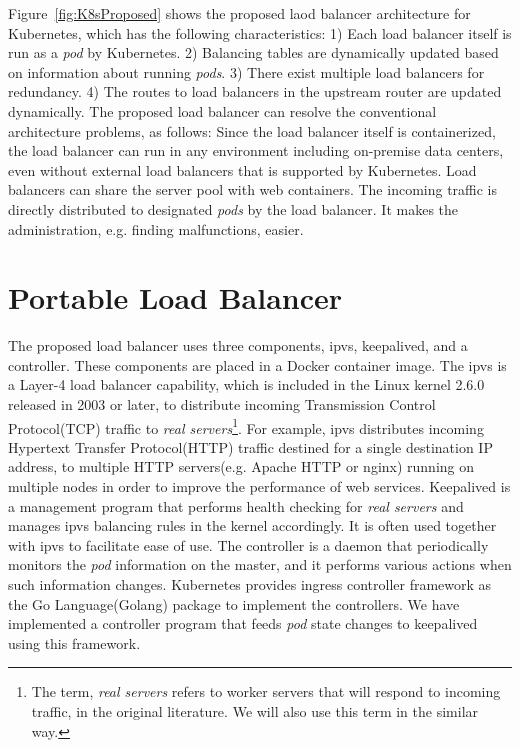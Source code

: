 Figure~\ref{fig:K8sProposed} shows the proposed laod balancer architecture for Kubernetes,
which has the following characteristics:
1) Each load balancer itself is run as a {\em pod} by Kubernetes. 
2) Balancing tables are dynamically updated based on information about running {\em pods}.
3) There exist multiple load balancers for redundancy.
4) The routes to load balancers in the upstream router are updated dynamically.
The proposed load balancer can resolve the conventional architecture problems, as follows:
Since the load balancer itself is containerized, the load balancer can run in any environment including on-premise data centers, even without external load balancers that is supported by Kubernetes.
Load balancers can share the server pool with web containers.
The incoming traffic is directly distributed to designated {\em pods} by the load balancer. 
It makes the administration, e.g. finding malfunctions, easier.

\section{Portable Load Balancer}

The proposed load balancer uses three components, ipvs, keepalived, and a controller. 
These components are placed in a Docker container image.
The ipvs is a Layer-4 load balancer capability, which is included in the Linux kernel 2.6.0 released in 2003 or later, 
to distribute incoming Transmission Control Protocol(TCP) traffic to 
{\em real servers}\footnote{The term, {\em real servers} refers to worker servers that will respond to incoming traffic, 
in the original literature\cite{Zhang2000}. We will also use this term in the similar way.}\cite{Zhang2000}. 
For example, ipvs distributes incoming Hypertext Transfer Protocol(HTTP) traffic destined for a single destination IP address, 
to multiple HTTP servers(e.g. Apache HTTP or nginx) running on multiple nodes in order to improve the performance of web services.
Keepalived is a management program that performs health checking for {\em real servers}
and manages ipvs balancing rules in the kernel accordingly.
It is often used together with ipvs to facilitate ease of use.
The controller is a daemon that periodically monitors the {\em pod} information on the master, 
and it performs various actions when such information changes.
Kubernetes provides ingress controller framework as the Go Language(Golang) package to implement the controllers. 
We have implemented a controller program that feeds {\em pod} state changes to keepalived 
using this framework. 

